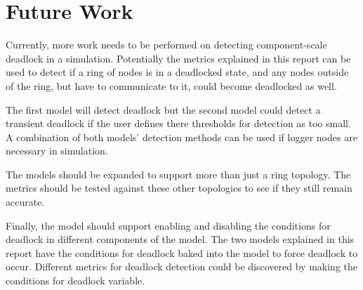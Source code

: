 \documentclass{article}
\begin{document}
\section{Future Work}
Currently, more work needs to be performed on detecting component-scale deadlock in a simulation. Potentially the metrics explained in this report can be used to detect if a ring of nodes is in a deadlocked state, and any nodes outside of the ring, but have to communicate to it, could become deadlocked as well.

The first model will detect deadlock but the second model could detect a transient deadlock if the user defines there thresholds for detection as too small. A combination of both models' detection methods can be used if logger nodes are necessary in simulation.

The models should be expanded to support more than just a ring topology. The metrics should be tested against these other topologies to see if they still remain accurate.

Finally, the model should support enabling and disabling the conditions for deadlock in different components of the model. The two models explained in this report have the conditions for deadlock baked into the model to force deadlock to occur. Different metrics for deadlock detection could be discovered by making the conditions for deadlock variable.



\end{document}
